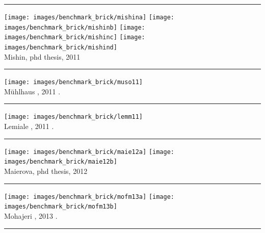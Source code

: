 \begin{center}\noindent\rule{12cm}{0.4pt}\end{center}

\begin{center}
\texttt{[image: images/benchmark\_brick/mishina]}
\texttt{[image: images/benchmark\_brick/mishinb]}
\texttt{[image: images/benchmark\_brick/mishinc]}
\texttt{[image: images/benchmark\_brick/mishind]}\\
{\captionfont Mishin, phd thesis, 2011 \cite{mishin11}}
\end{center}

\begin{center}\noindent\rule{12cm}{0.4pt}\end{center}

\begin{center}
\texttt{[image: images/benchmark\_brick/muso11]}\\
{\captionfont M{\"u}hlhaus \etal, 2011 \cite{muso11}.}
\end{center}

\begin{center}\noindent\rule{12cm}{0.4pt}\end{center}

\begin{center}
\texttt{[image: images/benchmark\_brick/lemm11]}\\
{\captionfont Lemiale \etal, 2011 \cite{lemm11}.}
\end{center}

\begin{center}\noindent\rule{12cm}{0.4pt}\end{center}

\begin{center}
\texttt{[image: images/benchmark\_brick/maie12a]}
\texttt{[image: images/benchmark\_brick/maie12b]}\\
{\captionfont Maierova, phd thesis, 2012 \cite{maie12}}
\end{center}

\begin{center}\noindent\rule{12cm}{0.4pt}\end{center}

\begin{center}
\texttt{[image: images/benchmark\_brick/mofm13a]}
\texttt{[image: images/benchmark\_brick/mofm13b]}\\
{\captionfont Mohajeri \etal, 2013 \cite{mofm13}.}
\end{center}

\begin{center}\noindent\rule{12cm}{0.4pt}\end{center}

